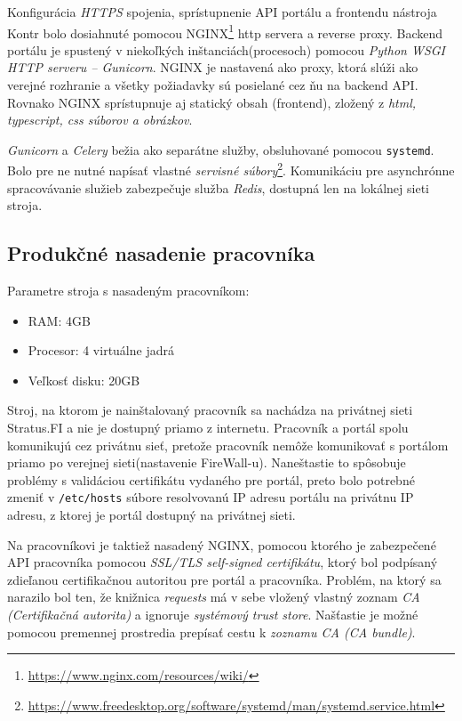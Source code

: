 \documentclass[
  digital, %
  twoside, %
  table,   %
  lof,     %
  lot,     %
]{fithesis3}
\begin{document}
Konfigurácia \emph{HTTPS} spojenia, sprístupnenie API portálu a frontendu nástroja Kontr bolo dosiahnuté pomocou NGINX\footnote{\url{https://www.nginx.com/resources/wiki/}} http servera a reverse proxy. Backend portálu je spustený v niekoľkých inštanciách(procesoch) pomocou \emph{Python WSGI HTTP serveru -- Gunicorn}. NGINX je nastavená ako proxy, ktorá slúži ako verejné rozhranie a všetky požiadavky sú posielané cez ňu na backend API. Rovnako NGINX sprístupnuje aj statický obsah (frontend), zložený z \emph{html, typescript, css súborov a obrázkov}.

\emph{Gunicorn} a \emph{Celery} bežia ako separátne služby, obsluhované pomocou \texttt{systemd}. Bolo pre ne nutné napísať vlastné \emph{servisné súbory}\footnote{\url{https://www.freedesktop.org/software/systemd/man/systemd.service.html}}. Komunikáciu pre asynchrónne spracovávanie služieb zabezpečuje služba \emph{Redis}, dostupná len na lokálnej sieti stroja.

\subsection{Produkčné nasadenie pracovníka}

Parametre stroja s nasadeným pracovníkom:
\begin{itemize}
    \item RAM: 4GB
    \item Procesor: 4 virtuálne jadrá
    \item Veľkosť disku: 20GB
\end{itemize}

Stroj, na ktorom je nainštalovaný pracovník sa nachádza na privátnej sieti Stratus.FI a nie je dostupný priamo z internetu. Pracovník a portál spolu komunikujú cez privátnu sieť, pretože pracovník nemôže komunikovať s portálom priamo po verejnej sieti(nastavenie FireWall-u). Naneštastie to spôsobuje problémy s validáciou certifikátu vydaného pre portál, preto bolo potrebné zmeniť v \texttt{/etc/hosts} súbore resolvovanú IP adresu portálu na privátnu IP adresu, z ktorej je portál dostupný na privátnej sieti.

Na pracovníkovi je taktiež nasadený NGINX, pomocou ktorého je zabezpečené API pracovníka pomocou \emph{SSL/TLS self-signed certifikátu}, ktorý bol podpísaný zdieľanou certifikačnou autoritou pre portál a pracovníka. Problém, na ktorý sa narazilo bol ten, že knižnica \emph{requests} má v sebe vložený vlastný zoznam \emph{CA (Certifikačná autorita)}\cite{RFC5280} a ignoruje \emph{systémový trust store}. Našťastie je možné pomocou premennej prostredia prepísať cestu k \emph{zoznamu CA (CA bundle)}.
\end{document}
